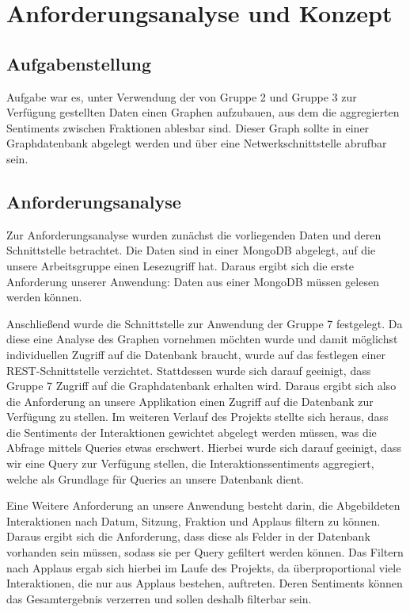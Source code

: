 \section{Anforderungsanalyse und Konzept}\label{sec:06_03_anforderungen_konzept}

\subsection{Aufgabenstellung}
Aufgabe war es, unter Verwendung der von Gruppe 2 und Gruppe 3 zur Verfügung gestellten Daten einen Graphen aufzubauen, aus dem die aggregierten Sentiments zwischen Fraktionen ablesbar sind. Dieser Graph sollte in einer Graphdatenbank abgelegt werden und über eine Netwerkschnittstelle abrufbar sein.

\subsection{Anforderungsanalyse}
Zur Anforderungsanalyse wurden zunächst die vorliegenden Daten und deren Schnittstelle betrachtet. Die Daten sind in einer MongoDB abgelegt, auf die unsere Arbeitsgruppe einen Lesezugriff hat. Daraus ergibt sich die erste Anforderung unserer Anwendung: Daten aus einer MongoDB müssen gelesen werden können.

Anschließend wurde die Schnittstelle zur Anwendung der Gruppe 7 festgelegt. Da diese eine Analyse des Graphen vornehmen möchten wurde und damit möglichst individuellen Zugriff auf die Datenbank braucht, wurde auf das festlegen einer REST-Schnittstelle verzichtet. Stattdessen wurde sich darauf geeinigt, dass Gruppe 7 Zugriff auf die Graphdatenbank erhalten wird. Daraus ergibt sich also die Anforderung an unsere Applikation einen Zugriff auf die Datenbank zur Verfügung zu stellen. Im weiteren Verlauf des Projekts stellte sich heraus, dass die Sentiments der Interaktionen gewichtet abgelegt werden müssen, was die Abfrage mittels Queries etwas erschwert. Hierbei wurde sich darauf geeinigt, dass wir eine Query zur Verfügung stellen, die Interaktionssentiments aggregiert, welche als Grundlage für Queries an unsere Datenbank dient.

Eine Weitere Anforderung an unsere Anwendung besteht darin, die Abgebildeten Interaktionen nach Datum, Sitzung, Fraktion und Applaus filtern zu können. Daraus ergibt sich die Anforderung, dass diese als Felder in der Datenbank vorhanden sein müssen, sodass sie per Query gefiltert werden können. Das Filtern nach Applaus ergab sich hierbei im Laufe des Projekts, da überproportional viele Interaktionen, die nur aus Applaus bestehen, auftreten. Deren Sentiments können das Gesamtergebnis verzerren und sollen deshalb filterbar sein. 

